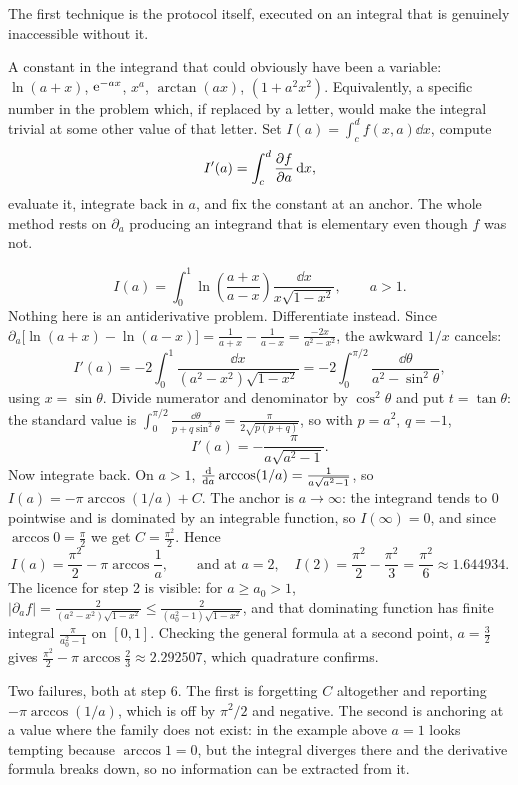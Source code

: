The first technique is the protocol itself, executed on an integral that is genuinely inaccessible without it.

\cue A constant in the integrand that could obviously have been a variable: $\ln(a+x)$, $\mathrm{e}^{-ax}$, $x^{a}$, $\arctan(ax)$, $(1+a^{2}x^{2})$. Equivalently, a specific number in the problem which, if replaced by a letter, would make the integral trivial at some other value of that letter.
\method Set $I(a)=\int_c^d f(x,a)\dd x$, compute
\[I'(a)=\int_c^d\frac{\partial f}{\partial a}\,\mathrm{d} x,\]
evaluate it, integrate back in $a$, and fix the constant at an anchor. The whole method rests on $\partial_a$ producing an integrand that is elementary even though $f$ was not.

\begin{worked}
\[I(a)=\int_0^1\ln\!\left(\frac{a+x}{a-x}\right)\frac{\dd x}{x\sqrt{1-x^{2}}},\qquad a>1.\]
Nothing here is an antiderivative problem. Differentiate instead. Since $\partial_a\bigl[\ln(a+x)-\ln(a-x)\bigr]=\tfrac{1}{a+x}-\tfrac{1}{a-x}=\tfrac{-2x}{a^{2}-x^{2}}$, the awkward $1/x$ cancels:
\[I'(a)=-2\int_0^1\frac{\dd x}{(a^{2}-x^{2})\sqrt{1-x^{2}}}=-2\int_0^{\pi/2}\frac{\dd\theta}{a^{2}-\sin^{2}\theta},\]
using $x=\sin\theta$. Divide numerator and denominator by $\cos^{2}\theta$ and put $t=\tan\theta$: the standard value is $\int_0^{\pi/2}\frac{\dd\theta}{p+q\sin^{2}\theta}=\frac{\pi}{2\sqrt{p(p+q)}}$, so with $p=a^{2}$, $q=-1$,
\[I'(a)=-\frac{\pi}{a\sqrt{a^{2}-1}}.\]
Now integrate back. On $a>1$, $\frac{\mathrm{d}}{\mathrm{d}a}\arccos(1/a)=\frac{1}{a\sqrt{a^{2}-1}}$, so $I(a)=-\pi\arccos(1/a)+C$. The anchor is $a\to\infty$: the integrand tends to $0$ pointwise and is dominated by an integrable function, so $I(\infty)=0$, and since $\arccos 0=\tfrac{\pi}{2}$ we get $C=\tfrac{\pi^{2}}{2}$. Hence
\[I(a)=\frac{\pi^{2}}{2}-\pi\arccos\frac1a,\qquad\text{and at }a=2,\quad I(2)=\frac{\pi^{2}}{2}-\frac{\pi^{2}}{3}=\frac{\pi^{2}}{6}\approx1.644934.\]
The licence for step 2 is visible: for $a\geq a_0>1$, $\bigl\lvert\partial_a f\bigr\rvert=\frac{2}{(a^{2}-x^{2})\sqrt{1-x^{2}}}\leq\frac{2}{(a_0^{2}-1)\sqrt{1-x^{2}}}$, and that dominating function has finite integral $\frac{\pi}{a_0^{2}-1}$ on $[0,1]$. Checking the general formula at a second point, $a=\tfrac32$ gives $\tfrac{\pi^{2}}{2}-\pi\arccos\tfrac23\approx2.292507$, which quadrature confirms.
\end{worked}

\begin{trap}
Two failures, both at step 6. The first is forgetting $C$ altogether and reporting $-\pi\arccos(1/a)$, which is off by $\pi^{2}/2$ and negative. The second is anchoring at a value where the family does not exist: in the example above $a=1$ looks tempting because $\arccos 1=0$, but the integral diverges there and the derivative formula breaks down, so no information can be extracted from it.
\end{trap}

